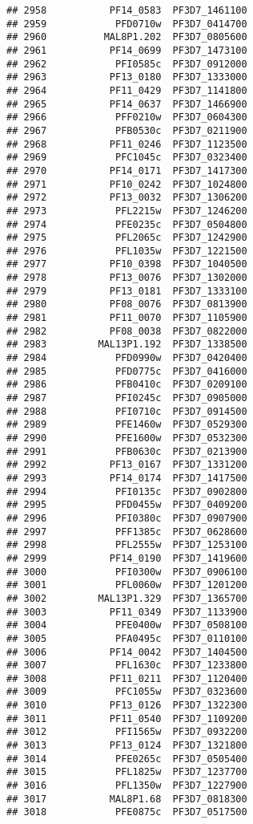 \documentclass[12pt, a4paper]{article}\usepackage[]{graphicx}\usepackage[]{color}
\makeatletter
\newenvironment{kframe}{%
 \def\at@end@of@kframe{}%
 \ifinner\ifhmode%
  \def\at@end@of@kframe{\end{minipage}}%
  \begin{minipage}{\columnwidth}%
 \fi\fi%
 \def\FrameCommand##1{\hskip\@totalleftmargin \hskip-\fboxsep
 \colorbox{shadecolor}{##1}\hskip-\fboxsep
     \hskip-\linewidth \hskip-\@totalleftmargin \hskip\columnwidth}%
 \MakeFramed {\advance\hsize-\width
   \@totalleftmargin\z@ \linewidth\hsize
   \@setminipage}}%
 {\par\unskip\endMakeFramed%
 \at@end@of@kframe}
\newenvironment{knitrout}{}{} %
\makeatother
\begin{document}
\begin{knitrout}
\begin{kframe}
\begin{verbatim}
## 2958           PF14_0583  PF3D7_1461100
## 2959            PFD0710w  PF3D7_0414700
## 2960          MAL8P1.202  PF3D7_0805600
## 2961           PF14_0699  PF3D7_1473100
## 2962            PFI0585c  PF3D7_0912000
## 2963           PF13_0180  PF3D7_1333000
## 2964           PF11_0429  PF3D7_1141800
## 2965           PF14_0637  PF3D7_1466900
## 2966            PFF0210w  PF3D7_0604300
## 2967            PFB0530c  PF3D7_0211900
## 2968           PF11_0246  PF3D7_1123500
## 2969            PFC1045c  PF3D7_0323400
## 2970           PF14_0171  PF3D7_1417300
## 2971           PF10_0242  PF3D7_1024800
## 2972           PF13_0032  PF3D7_1306200
## 2973            PFL2215w  PF3D7_1246200
## 2974            PFE0235c  PF3D7_0504800
## 2975            PFL2065c  PF3D7_1242900
## 2976            PFL1035w  PF3D7_1221500
## 2977           PF10_0398  PF3D7_1040500
## 2978           PF13_0076  PF3D7_1302000
## 2979           PF13_0181  PF3D7_1333100
## 2980           PF08_0076  PF3D7_0813900
## 2981           PF11_0070  PF3D7_1105900
## 2982           PF08_0038  PF3D7_0822000
## 2983         MAL13P1.192  PF3D7_1338500
## 2984            PFD0990w  PF3D7_0420400
## 2985            PFD0775c  PF3D7_0416000
## 2986            PFB0410c  PF3D7_0209100
## 2987            PFI0245c  PF3D7_0905000
## 2988            PFI0710c  PF3D7_0914500
## 2989            PFE1460w  PF3D7_0529300
## 2990            PFE1600w  PF3D7_0532300
## 2991            PFB0630c  PF3D7_0213900
## 2992           PF13_0167  PF3D7_1331200
## 2993           PF14_0174  PF3D7_1417500
## 2994            PFI0135c  PF3D7_0902800
## 2995            PFD0455w  PF3D7_0409200
## 2996            PFI0380c  PF3D7_0907900
## 2997            PFF1385c  PF3D7_0628600
## 2998            PFL2555w  PF3D7_1253100
## 2999           PF14_0190  PF3D7_1419600
## 3000            PFI0300w  PF3D7_0906100
## 3001            PFL0060w  PF3D7_1201200
## 3002         MAL13P1.329  PF3D7_1365700
## 3003           PF11_0349  PF3D7_1133900
## 3004            PFE0400w  PF3D7_0508100
## 3005            PFA0495c  PF3D7_0110100
## 3006           PF14_0042  PF3D7_1404500
## 3007            PFL1630c  PF3D7_1233800
## 3008           PF11_0211  PF3D7_1120400
## 3009            PFC1055w  PF3D7_0323600
## 3010           PF13_0126  PF3D7_1322300
## 3011           PF11_0540  PF3D7_1109200
## 3012            PFI1565w  PF3D7_0932200
## 3013           PF13_0124  PF3D7_1321800
## 3014            PFE0265c  PF3D7_0505400
## 3015            PFL1825w  PF3D7_1237700
## 3016            PFL1350w  PF3D7_1227900
## 3017           MAL8P1.68  PF3D7_0818300
## 3018            PFE0875c  PF3D7_0517500

\end{verbatim}
\end{kframe}
\end{knitrout}
\end{document}
